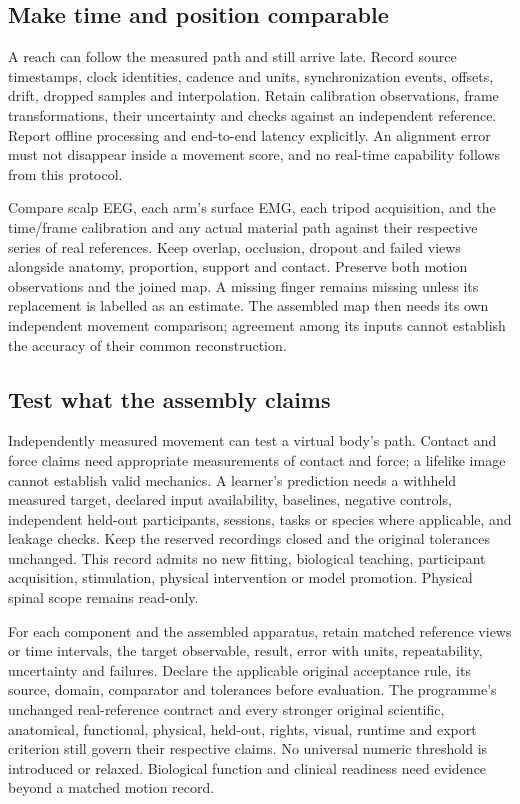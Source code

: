 \subsection*{Make time and position comparable}

A reach can follow the measured path and still arrive late. Record source
timestamps, clock identities, cadence and units, synchronization events,
offsets, drift, dropped samples and interpolation. Retain calibration
observations, frame transformations, their uncertainty and checks against an
independent reference. Report offline processing and end-to-end latency
explicitly. An alignment error must not disappear inside a movement score,
and no real-time capability follows from this protocol.

Compare scalp EEG, each arm's surface EMG, each tripod acquisition, and the
time/frame calibration and any actual material path against their respective
series of real references. Keep overlap, occlusion, dropout and failed views
alongside anatomy, proportion, support and contact. Preserve both motion
observations and the joined map. A missing finger remains missing unless its
replacement is labelled as an estimate. The assembled map then needs its own
independent movement comparison; agreement among its inputs cannot establish
the accuracy of their common reconstruction.

\subsection*{Test what the assembly claims}

Independently measured movement can test a virtual body's path. Contact and
force claims need appropriate measurements of contact and force; a lifelike
image cannot establish valid mechanics. A learner's prediction needs a
withheld measured target, declared input availability, baselines, negative
controls, independent held-out participants, sessions, tasks or species where
applicable, and leakage checks. Keep the reserved recordings closed and the
original tolerances unchanged. This record admits no new fitting, biological
teaching, participant acquisition, stimulation, physical intervention or
model promotion. Physical spinal scope remains read-only.

For each component and the assembled apparatus, retain matched reference
views or time intervals, the target observable, result, error with units,
repeatability, uncertainty and failures. Declare the applicable original
acceptance rule, its source, domain, comparator and tolerances before evaluation.
The programme's unchanged real-reference contract and every stronger original
scientific, anatomical, functional, physical, held-out, rights, visual, runtime
and export criterion still govern their respective claims. No universal
numeric threshold is introduced or relaxed. Biological function and clinical
readiness need evidence beyond a matched motion record.

